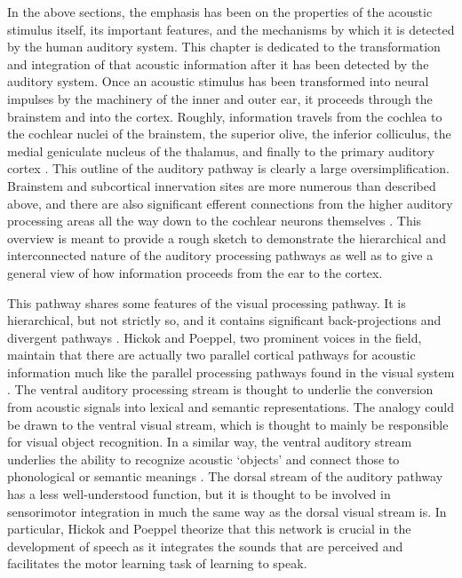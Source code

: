 \documentclass[titlepage]{article}
\begin{document}
  In the above sections, the emphasis has been on the properties of the
  acoustic stimulus itself, its important features, and the mechanisms by
  which it is detected by the human auditory system. This chapter is dedicated
  to the transformation and integration of that acoustic information after it
  has been detected by the auditory system. Once an acoustic stimulus has
  been transformed into neural impulses by the machinery of the inner and outer
  ear, it proceeds through the brainstem and into the cortex. Roughly,
  information travels from the cochlea to the cochlear nuclei of the brainstem,
  the superior olive, the inferior colliculus, the medial geniculate nucleus of
  the thalamus, and finally to the primary auditory cortex
  \cite{Hickok2007,Webster1992}. This outline of the auditory pathway is
  clearly a large oversimplification. Brainstem and subcortical innervation
  sites are more numerous than described above, and there are also significant
  efferent connections from the higher auditory processing areas all the way
  down to the cochlear neurons themselves \cite{Kandel2000,Webster1992}. This
  overview is meant to provide a rough sketch to demonstrate the hierarchical
  and interconnected nature of the auditory processing pathways as well as to
  give a general view of how information proceeds from the ear to the cortex.


  This pathway shares some features of the visual processing pathway. It is
  hierarchical, but not strictly so, and it contains significant
  back-projections and divergent pathways \cite{Webster1992,Hickok2007}.
  Hickok and Poeppel, two prominent voices in the field, maintain that there
  are actually two parallel cortical pathways for acoustic information much
  like the parallel processing pathways found in the visual system
  \cite{Hickok2007,Hickok2004,Hickok2000}. The ventral auditory processing
  stream is thought to underlie the conversion from acoustic signals into
  lexical and semantic representations. The analogy could be drawn to the
  ventral visual stream, which is thought to mainly be responsible for visual
  object recognition. In a similar way, the ventral auditory stream underlies
  the ability to recognize acoustic `objects' and connect those to phonological
  or semantic meanings \cite{Parker2005,Rauschecker2009}. The dorsal stream of
  the auditory pathway has a less well-understood function, but it is thought
  to be involved in sensorimotor integration in much the same way as the dorsal
  visual stream is. In particular, Hickok and Poeppel theorize that this
  network is crucial in the development of speech as it integrates the sounds
  that are perceived and facilitates the motor learning task of learning to
  speak.
\end{document}
